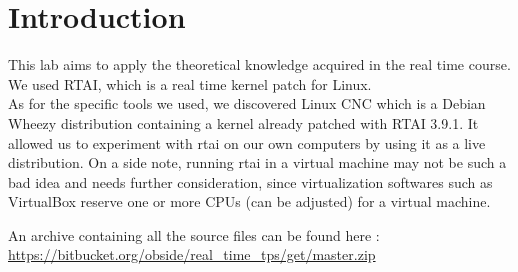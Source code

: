 \section{Introduction}
This lab aims to apply the theoretical knowledge acquired in the real time course. We used RTAI, which is a real time kernel patch for Linux.\\

As for the specific tools we used, we discovered Linux CNC \cite{cite:linuxcnc} which is a Debian Wheezy distribution containing a kernel already patched with RTAI 3.9.1. It allowed us to experiment with rtai on our own computers by using it as a live distribution. On a side note, running rtai in a virtual machine may not be such a bad idea and needs further consideration, since virtualization softwares such as VirtualBox reserve one or more CPUs (can be adjusted) for a virtual machine.\\

\begin{framehint}
An archive containing all the source files can be found here :\\    \href{https://bitbucket.org/obside/real_time_tps/get/master.zip}{https://bitbucket.org/obside/real\_time\_tps/get/master.zip}
\end{framehint}

